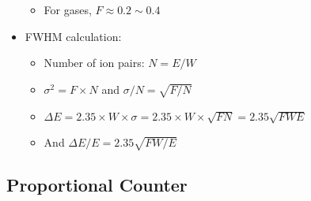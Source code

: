 \begin{itemize}
\begin{itemize}
        \item For gases, $F\approx0.2\sim0.4$
    \end{itemize}
    \item FWHM calculation:
    \begin{itemize}
        \item[] Number of ion pairs: $N=E/W$
        \item[] $\sigma^2=F\times N$ and $\sigma/N=\sqrt{F/N}$
        \item[] $\Delta E=2.35\times W\times \sigma=2.35\times W\times\sqrt{FN}=2.35\sqrt{FWE}$
        \item[] And $\Delta E/E=2.35\sqrt{FW/E}$
    \end{itemize}
\end{itemize}
\subsection{Proportional Counter}

